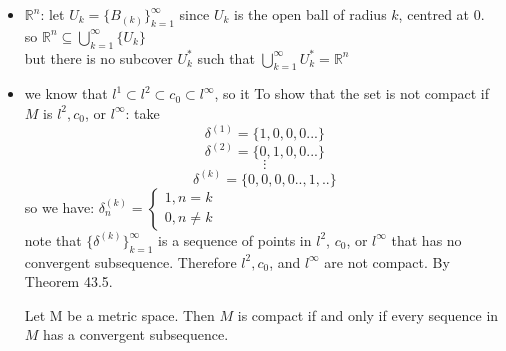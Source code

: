 \documentclass{amsbook}
\begin{document}
\begin{tcolorbox}[enhanced,attach boxed title to top center={yshift=-3mm,yshifttext=-1mm},
  colback=blue!5!white,colframe=blue!75!black,colbacktitle=red!80!black,
  title=Exercise 42.1:,fonttitle=\bfseries,
  boxed title style={size=small,colframe=red!50!black} ]
   \begin{itemize}
         \item {\color{red}$\mathbb{R}^n$}:
         let $U_k=\{B_{(k)}\}_{k=1}^{\infty}$ since $U_k$ is the open ball of radius $k$, centred at $0$.\\
         so $\mathbb{R}^n\subseteq\bigcup_{k=1}^{\infty}\{U_k\}$\\
         but there is no subcover $U_{k}^{*}$ such that $\bigcup_{k=1}^{\infty}U_{k}^{*}=\mathbb{R}^n$
         \item we know that $l^1\subset l^2\subset c_0\subset l^\infty$, so it 
To show that the set is not compact if $M$ is $l^2,c_0$, or $l^\infty$:
take $$\delta^{(1)}=\{1,0,0,0...\}$$
$$\delta^{(2)}=\{0,1,0,0...\}$$
$$\vdots$$
$$\delta^{(k)}=\{0,0,0,0..,1,..\}$$
so we have: $\delta^{(k)}_n=
\begin{cases} 
    1 ,n=k\\
0 ,n\neq k 
   \end{cases}$\\
   note that $\{\delta^{(k)}\}^{\infty}_{k=1}$ is a sequence of points in $l^2$, $c_0$, or $l^\infty$ that has 
   no convergent subsequence.
Therefore $l^2, c_0$, and $l^\infty$ are not compact. By Theorem 43.5.
\begin{tcolorbox}[colback=red!5!white,colframe=red!75!black]
Let M be a metric space. Then $M$ is compact if and only if every sequence in $M$ has a convergent subsequence.
\end{tcolorbox}
\end{itemize}
\end{tcolorbox}

\end{document}
